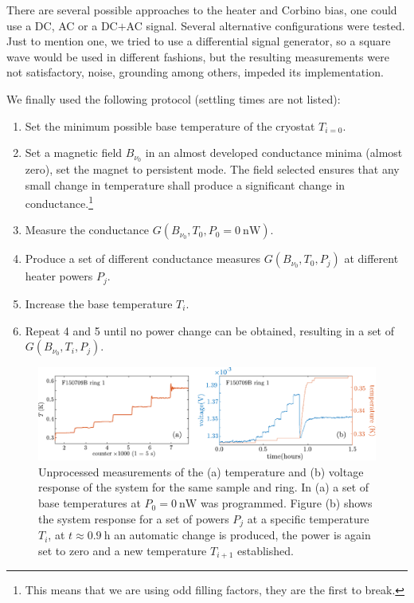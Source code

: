 There are several possible approaches to the heater and Corbino bias, one could use a DC, AC or a DC$+$AC signal. Several alternative configurations were tested. Just to mention one, we tried to use a differential signal generator, so a square wave would be used in different fashions, but the resulting measurements were not satisfactory, noise, grounding among others, impeded its implementation.

We finally used the following protocol (settling times are not listed):
\begin{enumerate}
    \item Set the minimum possible base temperature of the cryostat $T_{i=0}$.
    \item\label{enum:field} Set a magnetic field $B_{\nu_0}$ in an almost developed conductance minima  (almost zero), set the magnet to persistent mode. The field selected ensures that any small change in temperature shall produce a significant change in conductance.\footnote{This means that we are using odd filling factors, they are the first to break.}
    \item\label{enum:zeroPower} Measure the conductance $G\left( B_{\nu_0}, T_0, P_0 = \SI{0}{\nano\watt} \right)$.
    \item\label{enum:tempCal} Produce a set of different conductance measures $G\left( B_{\nu_0}, T_0, P_j \right)$ at different heater powers $P_j$.
    \item Increase the base temperature $T_i$.
    \item Repeat 4 and 5 until no power change can be obtained, resulting in a set of $G\left( B_{\nu_0}, T_i, P_j \right)$.
\end{enumerate}

\begin{figure}
    \centering
    \includegraphics[width=1\textwidth]{figures/temperature_corbino/DCresponseVoltageTempCounter.pdf}
    \caption{Unprocessed measurements of the (a) temperature and (b) voltage response of the system for the same sample and ring. In (a) a set of base temperatures at $P_0 = \SI{0}{\nano\watt}$ was programmed. Figure (b) shows the system response for a set of powers $P_j$ at a specific temperature $T_i$, at  $t \approx \SI{0.9}{\hour}$ an automatic change is produced, the power is again set to zero and a new temperature $T_{i+1}$ established.}
    \label{fig:DCvoltTempCounter}
\end{figure}

